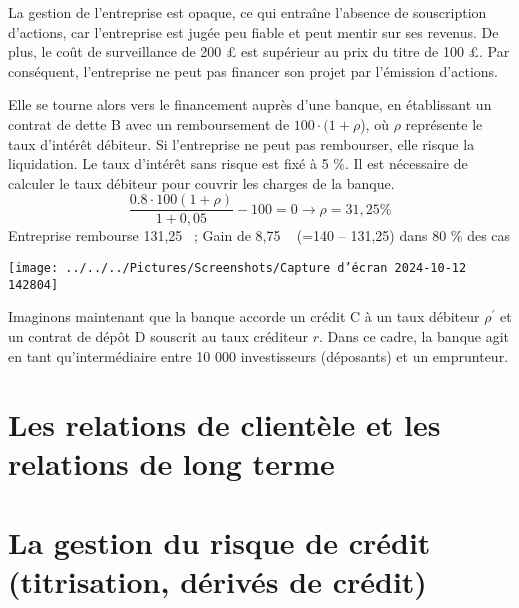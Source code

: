\documentclass[a4paper, 12pt]{report}
\begin{document}
La gestion de l’entreprise est opaque, ce qui entraîne l'absence de souscription d’actions, car l'entreprise est jugée peu fiable et peut mentir sur ses revenus. De plus, le coût de surveillance de 200 £ est supérieur au prix du titre de 100 £. Par conséquent, l’entreprise ne peut pas financer son projet par l’émission d’actions.

Elle se tourne alors vers le financement auprès d’une banque, en établissant un contrat de dette B avec un remboursement de $100 \cdot (1 + \rho$), où $\rho$ représente le taux d’intérêt débiteur. Si l’entreprise ne peut pas rembourser, elle risque la liquidation. Le taux d’intérêt sans risque est fixé à 5 \%. Il est nécessaire de calculer le taux débiteur pour couvrir les charges de la banque.
$$
\frac{0.8\cdot100(1+\rho)}{1+0,05}-100=0\longrightarrow \rho=31,25\%
$$
Entreprise rembourse 131,25 \textsterling~; Gain de 8,75 \textsterling~ (=140 – 131,25) dans 80 \% des cas

\begin{center}
	\texttt{[image: ../../../Pictures/Screenshots/Capture d'écran 2024-10-12 142804]}
\end{center}

Imaginons maintenant que la banque accorde un crédit C à un taux débiteur $\rho^{'}$ et un contrat de dépôt D souscrit au taux créditeur $r$. Dans ce cadre, la banque agit en tant qu'intermédiaire entre 10 000 investisseurs (déposants) et un emprunteur.






\section{Les relations de clientèle et les relations de long terme}

\section{La gestion du risque de crédit (titrisation, dérivés de crédit)}
\end{document}
